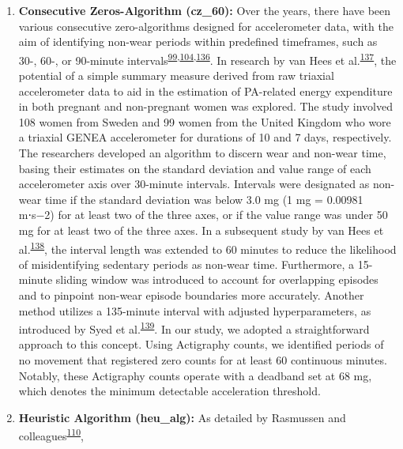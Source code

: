 \documentclass[
  10pt,
]{scrbook}
\let\originaltextbf\textbf
\renewcommand{\textbf}[1]{\textcolor{color1}{\textsf{\originaltextbf{#1}}}}
\begin{document}
\begin{enumerate}
\def\labelenumi{\arabic{enumi}.}
\item
  \textsf{\textbf{Consecutive Zeros-Algorithm (cz\_60):}} Over the
  years, there have been various consecutive zero-algorithms designed
  for accelerometer data, with the aim of identifying non-wear periods
  within predefined timeframes, such as 30-, 60-, or 90-minute
  intervals\textsuperscript{\protect\hyperlink{ref-choi_validation_2011}{99},\protect\hyperlink{ref-hecht_methodology_2009}{104},\protect\hyperlink{ref-troiano_physical_2008}{136}}.
  In research by van Hees et
  al.\textsuperscript{\protect\hyperlink{ref-van_hees_estimation_2011}{137}},
  the potential of a simple summary measure derived from raw triaxial
  accelerometer data to aid in the estimation of PA-related energy
  expenditure in both pregnant and non-pregnant women was explored. The
  study involved 108 women from Sweden and 99 women from the United
  Kingdom who wore a triaxial GENEA accelerometer for durations of 10
  and 7 days, respectively. The researchers developed an algorithm to
  discern wear and non-wear time, basing their estimates on the standard
  deviation and value range of each accelerometer axis over 30-minute
  intervals. Intervals were designated as non-wear time if the standard
  deviation was below 3.0 mg (1 mg = 0.00981 m⋅s−2) for at least two of
  the three axes, or if the value range was under 50 mg for at least two
  of the three axes. In a subsequent study by van Hees et
  al.\textsuperscript{\protect\hyperlink{ref-hees_separating_2013}{138}},
  the interval length was extended to 60 minutes to reduce the
  likelihood of misidentifying sedentary periods as non-wear time.
  Furthermore, a 15-minute sliding window was introduced to account for
  overlapping episodes and to pinpoint non-wear episode boundaries more
  accurately. Another method utilizes a 135-minute interval with
  adjusted hyperparameters, as introduced by Syed et
  al.\textsuperscript{\protect\hyperlink{ref-syed_evaluating_2020}{139}}.
  In our study, we adopted a straightforward approach to this concept.
  Using Actigraphy counts, we identified periods of no movement that
  registered zero counts for at least 60 continuous minutes. Notably,
  these Actigraphy counts operate with a deadband set at 68 mg, which
  denotes the minimum detectable acceleration threshold.
\item
  \textsf{\textbf{Heuristic Algorithm (heu\_alg):}} As detailed by
  Rasmussen and
  colleagues\textsuperscript{\protect\hyperlink{ref-rasmussen_short-term_2020}{110}},

\end{enumerate}
\end{document}
